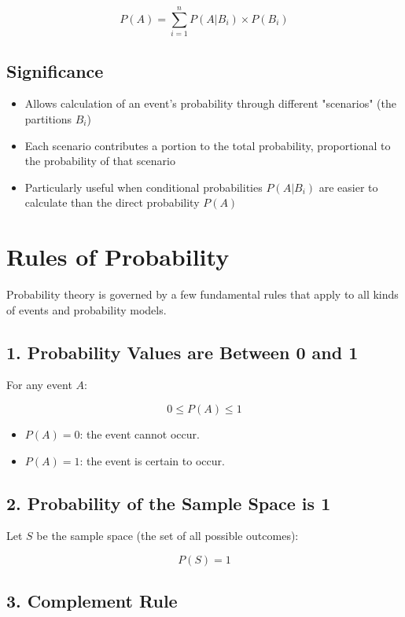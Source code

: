 \documentclass{article}
\begin{document}
\[P(A) = \sum_{i=1}^{n} P(A|B_i) \times P(B_i)\]

\subsection{Significance}
\begin{itemize}
\item Allows calculation of an event's probability through different "scenarios" (the partitions $B_i$)
\item Each scenario contributes a portion to the total probability, proportional to the probability of that scenario
\item Particularly useful when conditional probabilities $P(A|B_i)$ are easier to calculate than the direct probability $P(A)$
\end{itemize}

\section{Rules of Probability}

Probability theory is governed by a few fundamental rules that apply to all kinds of events and probability models.

\subsection*{1. Probability Values are Between 0 and 1}

For any event \( A \):

\[
0 \leq P(A) \leq 1
\]

\begin{itemize}
    \item \( P(A) = 0 \): the event cannot occur.
    \item \( P(A) = 1 \): the event is certain to occur.
\end{itemize}

\subsection*{2. Probability of the Sample Space is 1}

Let \( S \) be the sample space (the set of all possible outcomes):

\[
P(S) = 1
\]

\subsection*{3. Complement Rule}
\end{document}
